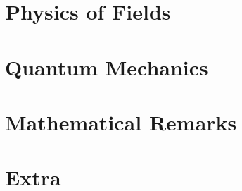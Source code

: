 \chapter{Physics of Fields}




% 
% 
% 
% 


\chapter{Quantum Mechanics}




\chapter{Mathematical Remarks}




\chapter{Extra}








\backmatter
\renewcommand{\emph}[1]{\textit{#1}}
\printbibliography


